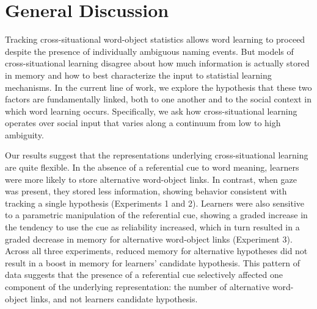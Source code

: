 \documentclass[authoryear, review]{elsarticle}
\providecommand{\DIFaddtex}[1]{{\protect\color{blue}\uwave{#1}}} %
\providecommand{\DIFaddbegin}{} %
\providecommand{\DIFadd}[1]{\texorpdfstring{\DIFaddtex{#1}}{#1}} %
\begin{document}
\section{General Discussion}\label{general-discussion}

Tracking cross-situational word-object statistics allows word learning
to proceed despite the presence of individually ambiguous naming events.
But models of cross-situational learning disagree about how much
information is actually stored in memory and how to best characterize
the input to statistial learning mechanisms. In the current line of
work, we explore the hypothesis that these two factors are fundamentally
linked, both to one another and to the social context in which word
learning occurs. Specifically, we ask how cross-situational learning
operates over social input that varies along a continuum from low to
high ambiguity.

Our results suggest that the representations underlying
cross-situational learning are quite flexible. In the absence of a
referential cue to word meaning, learners were more likely to store
alternative word-object links. In contrast, when gaze was present, they
stored less information, showing behavior consistent with tracking a
single hypothesis (Experiments 1 and 2). Learners were also sensitive to
a parametric manipulation of the referential cue, showing a graded
increase in the tendency to use the cue as reliability increased, which
in turn resulted in a graded decrease in memory for alternative
word-object links (Experiment 3). Across all three experiments, reduced
memory for alternative hypotheses did not result in a boost in memory
for learners' candidate hypothesis. This pattern of data suggests that
the presence of a referential cue selectively affected one component of
the underlying representation: the number of alternative word-object
links, and not learners candidate hypothesis.

\DIFaddbegin \subsection{\DIFadd{Relationship to previous
work}}\label{relationship-to-previous-work}
\end{document}
